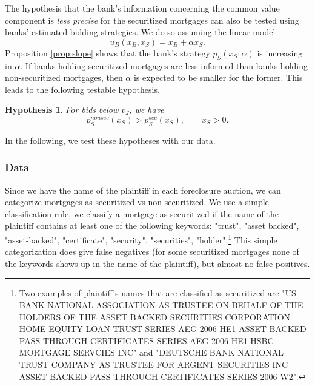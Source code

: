 \documentclass[11pt,twopage]{article}
\newtheorem{conjecture}{Hypothesis}
{\bf}{\it}
\begin{document}
The hypothesis that the bank's information concerning the common value component is \emph{less precise} for the securitized mortgages can also be tested using banks' estimated bidding strategies. We do so assuming the linear model 
\[
u_B(x_B,x_S) = x_B+\alpha x_S .
\] 
Proposition \ref{prop:slope} shows that the bank's strategy $p_S(x_S;\alpha)$ is increasing in $\alpha$. 
If banks holding securitized mortgages are less informed than banks holding non-securitized mortgages, then $\alpha$ is expected to be smaller for the former. This leads to the following testable hypothesis.
%


\begin{conjecture}\label{hyp:slope}
	For bids below $v_J$, we have \[ p_S^{nonsec}(x_S) > p_S^{sec}(x_S), \quad\quad x_S>0 .\] \end{conjecture}

In the following, we test these hypotheses with our data.

%

\subsubsection{Data}

Since we have the name of the plaintiff in each foreclosure auction,
we can categorize mortgages as securitized vs non-securitized. We use
a simple classification rule, we classify a mortgage as securitized if
the name of the plaintiff contains at least one of the following
keywords: "trust", "asset backed", "asset-backed",
"certificate", "security", "securities", "holder".\footnote{Two examples of plaintiff's names that are classified as securitized are "US BANK NATIONAL ASSOCIATION AS TRUSTEE ON BEHALF OF THE HOLDERS OF THE ASSET BACKED SECURITIES CORPORATION HOME EQUITY LOAN TRUST SERIES AEG 2006-HE1 ASSET BACKED PASS-THROUGH CERTIFICATES SERIES AEG 2006-HE1
	HSBC MORTGAGE SERVCIES INC" and "DEUTSCHE BANK NATIONAL TRUST COMPANY AS TRUSTEE FOR ARGENT SECURITIES INC ASSET-BACKED PASS-THROUGH CERTIFICATES SERIES 2006-W2".} This simple
categorization does give false negatives (for some securitized
mortgages none of the keywords shows up in the name of the plaintiff),
but almost no false positives.
\end{document}
